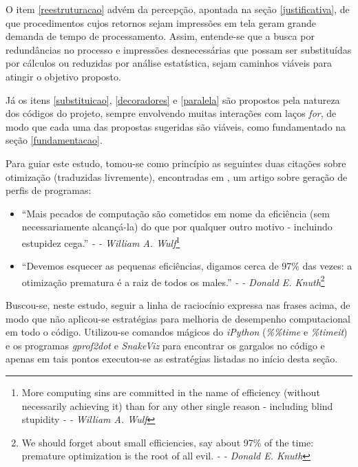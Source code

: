 \documentclass[12pt]{article}
\newcommand{\aspas}[1]{``#1''} %
\begin{document}
O item \ref{reestruturacao} advém da percepção, apontada na seção \ref{justificativa}, de que procedimentos cujos retornos sejam impressões em tela geram grande demanda de tempo de processamento. Assim, entende-se que a busca por redundâncias no processo e impressões desnecessárias que possam ser substituídas por cálculos ou reduzidas por análise estatística, sejam caminhos viáveis para atingir o objetivo proposto.

Já os itens \ref{substituicao}, \ref{decoradores} e \ref{paralela} são propostos pela natureza dos códigos do projeto, sempre envolvendo muitas interações com laços \textit{for}, de modo que cada uma das propostas sugeridas são viáveis, como fundamentado na seção \ref{fundamentacao}. 

Para guiar este estudo, tomou-se como princípio as seguintes duas citações sobre otimização (traduzidas livremente), encontradas em \cite{hegde:2004}, um artigo sobre geração de perfis de programas:

\begin{itemize}
	\item \aspas{Mais pecados de computação são cometidos em nome da eficiência (sem necessariamente alcançá-la) do que por qualquer outro motivo - incluindo estupidez cega.} \textit{- -  William A. Wulf}\footnote{More computing sins are committed in the name of efficiency (without necessarily achieving it) than for any other single reason - including blind stupidity \textit{- -  William A. Wulf}}
	\item \aspas{Devemos esquecer as pequenas eficiências, digamos cerca de 97\% das vezes: a otimização prematura é a raiz de todos os males.} \textit{- -  Donald E. Knuth}\footnote{We should forget about small efficiencies, say about 97\% of the time: premature optimization is the root of all evil. \textit{- -  Donald E. Knuth}}
\end{itemize}

Buscou-se, neste estudo, seguir a linha de raciocínio expressa nas frases acima, de modo que não aplicou-se estratégias para melhoria de desempenho computacional em todo o código. Utilizou-se comandos mágicos do \textit{iPython} (\textit{\%\%time} e \textit{\%timeit}) e os programas \textit{gprof2dot} e \textit{SnakeViz} para encontrar os gargalos no código e apenas em tais pontos executou-se as estratégias listadas no início desta seção.


\end{document}
